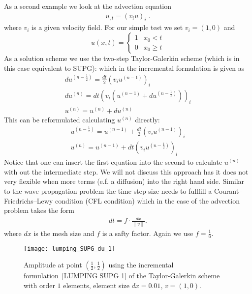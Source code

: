 As a second example 
we look at the advection equation
\begin{eqnarray} \label{LUMPING ADVECTIVE} 
u_{,t}=(v_i u)_i \; .
\end{eqnarray}
where $v_i$ is a given velocity field. For our simple test we set $v_i=(1,0)$ and
\begin{equation} \label{LUMPING ADVECTIVE TEST} 
u(x,t)= 
\left\{
   \begin{array}{cl}
   1 &  x_0 < t \\
   0 &  x_0 \ge t 
   \end{array}
\right.
\end{equation}
As a solution scheme we use the two-step Taylor-Galerkin scheme 
(which is in this case equivalent to SUPG):
which in the incremental formulation is given as
\begin{eqnarray} \label{LUMPING SUPG 1} 
du^{(n-\frac{1}{2})} = \frac{dt}{2} (v_i u^{(n-1)})_i \\
du^{(n)} = dt (v_i (u^{(n-1)}+du^{(n-\frac{1}{2})}) )_i \\
u^{(n)} = u^{(n)} + du^{(n)} 
\end{eqnarray}
This can be reformulated calculating $u^{(n)}$ directly:
\begin{eqnarray} \label{LUMPING SUPG 2} 
u^{(n-\frac{1}{2})} = u^{(n-1)} + \frac{dt}{2} (v_i u^{(n-1)})_i \\
u^{(n)} =  u^{(n-1)} + dt (v_i u^{(n-\frac{1}{2})} )_i 
\end{eqnarray}
Notice that one can insert the first equation into the second to calculate $u^{(n)}$ with out the intermediate step. We
will not discuss this approach has it does not very flexible when more terms (e.f. a diffusion) into the right hand side. 
Similar to the wave propagation problem the time step size needs to fullfill a 
Courant–Friedrichs–Lewy condition (CFL condition) which 
in the case of the advection problem takes the form
\begin{eqnarray} \label{LUMPING ADVECTION CFL} 
dt = f \cdot \frac{dx}{\|v\|} .
\end{eqnarray}
where $dx$ is the mesh size and $f$ is a safty factor. Again we use $f=\frac{1}{6}$.

\begin{figure}
\centerline{\texttt{[image: lumping\_SUPG\_du\_1]}}
\caption{Amplitude at point $(\frac{1}{2},\frac{1}{2})$ using the incremental formulation~\ref{LUMPING SUPG 1} of the 
Taylor-Galerkin scheme with order $1$ elements, element size $dx=0.01$, $v=(1,0)$.}
\label{FIG LUMPING SUPG INC A}
\end{figure}

